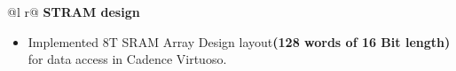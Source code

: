 \documentclass[a4paper,10pt]{article}
\begin{document}
\begin{tabularx}{\linewidth}{ @{}l r@{} }
\textbf{STRAM design} \\[2.75pt]
{
\begin{minipage}[t]{\linewidth}
    \begin{itemize}[nosep,after=\strut, leftmargin=2em, itemsep=3pt]
   
    
    
    \item Implemented 8T SRAM Array Design layout\textbf{(128 words of 16 Bit length)} for data access in Cadence Virtuoso. 
    
    \end{itemize}
\end{minipage}
}  %
\end{tabularx}

\end{document}
